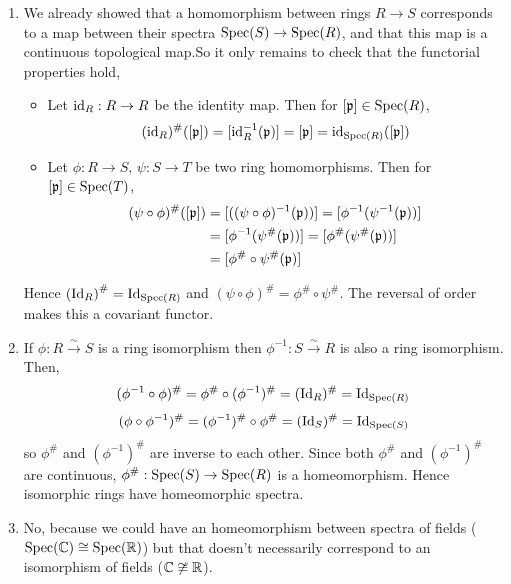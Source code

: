 \documentclass[Notebook.tex]{subfiles}
\begin{document}
\begin{solution}
    \bbni
    \begin{enumerate}[label=(\alph*),ref=\theenumi\alph*]
        \item We already showed that a homomorphism between rings $R \to S$ corresponds to a map between their spectra $\operatorname{Spec}(S) \to \operatorname{Spec}(R)$, and that this map is a continuous topological map.So it only remains to check that the functorial properties hold,
        \begin{itemize}
            \item Let $\operatorname{id}_R: R \to R$ be the identity map. Then for $[\operatorname{\mathfrak{p}}] \in \operatorname{Spec}(R)$,
            \[(\operatorname{id}_R)^{\#}([\operatorname{\mathfrak{p}}]) = [\operatorname{id}_R^{-1}(\operatorname{\mathfrak{p}})] = [\operatorname{\mathfrak{p}}] = \operatorname{id}_{\operatorname{Spec}(R)}([\operatorname{\mathfrak{p}}])\]
            \item Let $\phi: R \to S, \, \psi: S\to T$ be two ring homomorphisms. Then for $[\operatorname{\mathfrak{p}}] \in \operatorname{Spec}(T)$,
            \begin{align*}
                (\psi \circ \phi)^{\#}([\operatorname{\mathfrak{p}}]) &= [((\psi \circ \phi)^{-1}(\operatorname{\mathfrak{p}}))] = [\phi^{-1}(\psi^{-1}(\operatorname{\mathfrak{p}}))] \\
                &= [\phi^{-1}(\psi^{\#}(\operatorname{\mathfrak{p}}))] = [\phi^{\#}(\psi^{\#}(\operatorname{\mathfrak{p}}))] \\
                &= [\phi^{\#} \circ \psi^{\#}(\operatorname{\mathfrak{p}})]
            \end{align*}
        \end{itemize}
        Hence $ \left(\operatorname{Id}_{R}\right)^{\#} = \operatorname{Id}_{\operatorname{Spec}(R)} $ and $\left(\psi \circ \phi\right)^{\#} = \phi^{\#} \circ \psi^{\#}$. 
        The reversal of order makes this a covariant functor. 

        \item If $\phi: R \xrightarrow{\sim} S$ is a ring isomorphism then $\phi^{-1}: S  \xrightarrow{\sim} R$ is also a ring isomorphism. Then, 
        \[(\phi^{-1} \circ \phi)^{\#} = \phi^{\#} \circ (\phi^{-1})^{\#} = (\operatorname{Id}_R)^{\#} = \operatorname{Id}_{\operatorname{Spec}(R)}\]
        \[(\phi \circ \phi^{-1})^{\#} = (\phi^{-1})^{\#} \circ \phi^{\#} = (\operatorname{Id}_S)^{\#} = \operatorname{Id}_{\operatorname{Spec}(S)}\]
        so $\phi^{\#}$ and $(\phi^{-1})^{\#}$ are inverse to each other. Since 
        both $\phi^{\#}$ and $(\phi^{-1})^{\#}$ are continuous, $\phi^{\#}: 
        \operatorname{Spec}(S) \to \operatorname{Spec}(R)$ is a homeomorphism. Hence isomorphic rings have 
        homeomorphic spectra. 

        \item No, because we could have an homeomorphism between spectra of fields ($\operatorname{Spec}(\mathbb C) \cong \operatorname{Spec}(\mathbb R)$) but that doesn't necessarily correspond to an isomorphism of fields ($\mathbb C \not \cong \mathbb R$). 
    \end{enumerate}
\end{solution}
\end{document}
